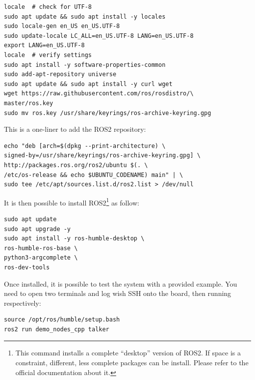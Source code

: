 \documentclass[10pt]{article}
\begin{document}
\begin{tcolorbox}
\begin{verbatim}
locale  # check for UTF-8
sudo apt update && sudo apt install -y locales
sudo locale-gen en_US en_US.UTF-8
sudo update-locale LC_ALL=en_US.UTF-8 LANG=en_US.UTF-8
export LANG=en_US.UTF-8
locale  # verify settings
sudo apt install -y software-properties-common
sudo add-apt-repository universe
sudo apt update && sudo apt install -y curl wget
wget https://raw.githubusercontent.com/ros/rosdistro/\
master/ros.key
sudo mv ros.key /usr/share/keyrings/ros-archive-keyring.gpg
\end{verbatim}
\end{tcolorbox}


This is a one-liner to add the ROS2 repository:

\begin{tcolorbox}
\begin{verbatim}
echo "deb [arch=$(dpkg --print-architecture) \
signed-by=/usr/share/keyrings/ros-archive-keyring.gpg] \
http://packages.ros.org/ros2/ubuntu $(. \
/etc/os-release && echo $UBUNTU_CODENAME) main" | \
sudo tee /etc/apt/sources.list.d/ros2.list > /dev/null
\end{verbatim}
\end{tcolorbox}

It is then possible to install ROS2\footnote{This command installs a complete ``desktop'' version of ROS2. If space is a constraint, different, less complete packages can be install. Please refer to the official documentation about it.} as follow:

\begin{tcolorbox}
\begin{verbatim}
sudo apt update
sudo apt upgrade -y
sudo apt install -y ros-humble-desktop \
ros-humble-ros-base \
python3-argcomplete \
ros-dev-tools
\end{verbatim}
\end{tcolorbox}

Once installed, it is possible to test the system with a provided example. You need to open two terminals and log wish SSH onto the board, then running respectively:

\begin{tcolorbox}
\begin{verbatim}
source /opt/ros/humble/setup.bash
ros2 run demo_nodes_cpp talker
\end{verbatim}
\end{tcolorbox}
\end{document}
